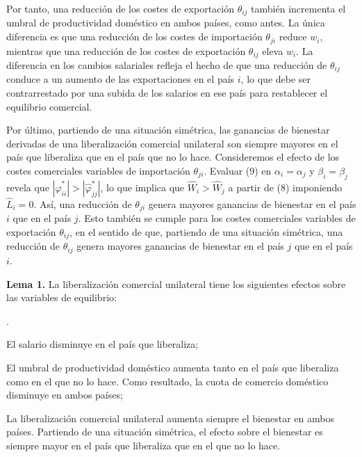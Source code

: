\documentclass[10pt,a4paper]{article}
\newcounter{numitem}
\newenvironment{lnum}
      {\begin{list}{\arabic{numitem}.}{%
          \usecounter{numitem}%
          \setlength{\leftmargin}{1cm}%
          \setlength{\parskip}{3pt}%
          \setlength{\itemsep}{0pt}%
          \setlength{\parsep}{0pt}%
      }}
      {\end{list}}
\begin{document}
Por tanto, una reducción de los costes de exportación $\theta_{ij}$ también incrementa el umbral de productividad doméstico en ambos países, como antes. La única diferencia es que una reducción de los costes de importación $\theta_{ji}$ reduce $w_i$, mientras que una reducción de los costes de exportación $\theta_{ij}$ eleva $w_i$. La diferencia en los cambios salariales refleja el hecho de que una reducción de $\theta_{ij}$ conduce a un aumento de las exportaciones en el país $i$, lo que debe ser contrarrestado por una subida de los salarios en ese país para restablecer el equilibrio comercial.

Por último, partiendo de una situación simétrica, las ganancias de bienestar derivadas de una liberalización comercial unilateral son siempre mayores en el país que liberaliza que en el país que no lo hace. Consideremos el efecto de los costes comerciales variables de importación $\theta_{ji}$. Evaluar (9) en $\alpha_i=\alpha_j$ y $\beta_i=\beta_j$ revela que $|\hat{\varphi}_{ii}^*| > |\hat{\varphi}_{jj}^*|$, lo que implica que $\hat{W}_i > \hat{W}_j$ a partir de (8) imponiendo $\hat{L}_i=0$. Así, una reducción de $\theta_{ji}$ genera mayores ganancias de bienestar en el país $i$ que en el país $j$. Esto también se cumple para los costes comerciales variables de exportación $\theta_{ij}$, en el sentido de que, partiendo de una situación simétrica, una reducción de $\theta_{ij}$ genera mayores ganancias de bienestar en el país $j$ que en el país $i$.

\textbf{Lema 1.} La liberalización comercial unilateral tiene los siguientes efectos sobre las variables de equilibrio:
\begin{lnum}
    \item El salario disminuye en el país que liberaliza;
    \item El umbral de productividad doméstico aumenta tanto en el país que liberaliza como en el que no lo hace. Como resultado, la cuota de comercio doméstico disminuye en ambos países;
    \item La liberalización comercial unilateral aumenta siempre el bienestar en ambos países. Partiendo de una situación simétrica, el efecto sobre el bienestar es siempre mayor en el país que liberaliza que en el que no lo hace.
\end{lnum}
\end{document}
